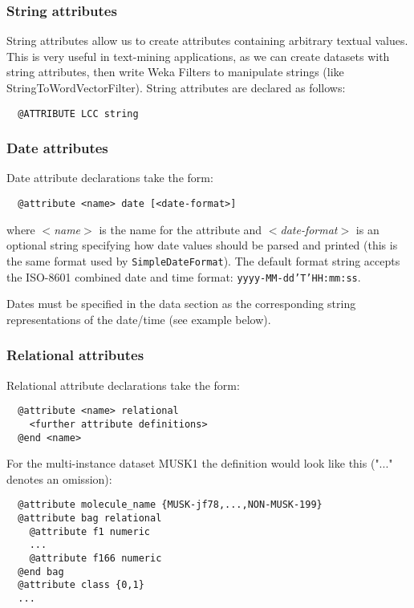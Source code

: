 \subsubsection*{String attributes}
String attributes allow us to create attributes containing arbitrary textual values. This is very useful in text-mining applications, as we can create datasets with string attributes, then write Weka Filters to manipulate strings (like StringToWordVectorFilter). String attributes are declared as follows:

\begin{verbatim}
  @ATTRIBUTE LCC string
\end{verbatim}


\subsubsection*{Date attributes}
Date attribute declarations take the form:

\begin{verbatim}
  @attribute <name> date [<date-format>]
\end{verbatim}

where \textit{$<$name$>$} is the name for the attribute and \textit{$<$date-format$>$} is an optional string specifying how date values should be parsed and printed (this is the same format used by \texttt{SimpleDateFormat}). The default format string accepts the ISO-8601 combined date and time format: \texttt{yyyy-MM-dd'T'HH:mm:ss}.

Dates must be specified in the data section as the corresponding string representations of the date/time (see example below). 

\subsubsection*{Relational attributes}
Relational attribute declarations take the form:

\begin{verbatim}
  @attribute <name> relational
    <further attribute definitions>
  @end <name>
\end{verbatim}

\noindent For the multi-instance dataset MUSK1 the definition would look like this ("..." denotes an omission):

\begin{verbatim}
  @attribute molecule_name {MUSK-jf78,...,NON-MUSK-199}
  @attribute bag relational
    @attribute f1 numeric
    ...
    @attribute f166 numeric
  @end bag
  @attribute class {0,1}
  ...
\end{verbatim}


